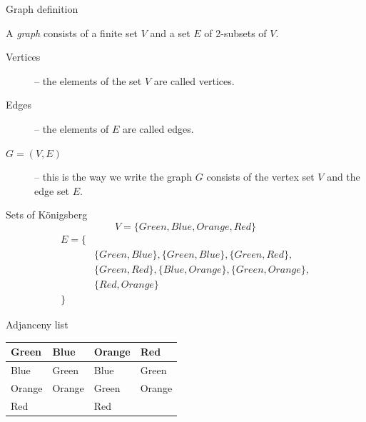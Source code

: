 \begin{frame}{Graph definition}
	\begin{definition}
	A \emph{graph} consists of a finite set $V$ and a set $E$ of 2-subsets of $V$.
	\end{definition}
	\vspace{0.25cm}
	\begin{description}
		\item[Vertices] -- the elements of the set $V$ are called vertices.
		\vspace{0.25cm}
		\item[Edges] -- the elements of $E$ are called edges.
		\vspace{0.25cm}
		\item[$G = (V,E)$] -- this is the way we write the graph $G$ consists of the vertex set $V$ and the edge set $E$.
	\end{description}
\end{frame}

\begin{frame}{Sets of K{\"o}nigsberg}
$$ V = \{Green, Blue, Orange, Red\} $$
\begin{align*}
E = \{&\\
			&\{Green, Blue\}, \{Green, Blue\}, \{Green, Red\},\\
      &\{Green, Red\}, \{Blue, Orange\}, \{Green, Orange\},\\
      &\{Red, Orange\}\\
      \}&
\end{align*}
\end{frame}

\begin{frame}{Adjanceny list}
	\begin{center}
	\begin{tabular}{l|l|l|l}
	Green & Blue & Orange & Red \\
	\hline
	Blue & Green & Blue & Green \\
	Orange & Orange & Green & Orange \\
	Red & & Red & 
	\end{tabular}
	\end{center}
\end{frame}

